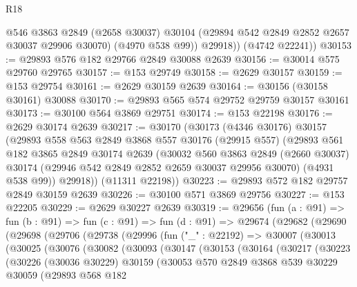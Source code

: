 \begin{lexlean}{R18}
\begin{coremodule}
            @546
            @3863
            @2849
            (@2658 @30037)
            @30104
            (@29894 @542 @2849 @2852 @2657 @30037 @29906 @30070)
            (@4970 @538 @99))
          @29918))
      (@4742 @22241))
@30153 := @29893 @576 @182 @29766 @2849 @30088 @2639
@30156 := @30014 @575 @29760 @29765
@30157 := @153 @29749
@30158 := @2629 @30157
@30159 := @153 @29754
@30161 := @2629 @30159 @2639
@30164 := @30156 (@30158 @30161) @30088
@30170 := @29893 @565 @574 @29752 @29759 @30157 @30161
@30173 := @30100 @564 @3869 @29751
@30174 := @153 @22198
@30176 := @2629 @30174 @2639
@30217 := @30170
    (@30173
      (@4346 @30176)
      @30157
      (@29893
        @558
        @563
        @2849
        @3868
        @557
        @30176
        (@29915 @557)
        (@29893
          @561
          @182
          @3865
          @2849
          @30174
          @2639
          (@30032
            @560
            @3863
            @2849
            (@2660 @30037)
            @30174
            (@29946 @542 @2849 @2852 @2659 @30037 @29956 @30070)
            (@4931 @538 @99))
          @29918))
      (@11311 @22198))
@30223 := @29893 @572 @182 @29757 @2849 @30159 @2639
@30226 := @30100 @571 @3869 @29756
@30227 := @153 @22205
@30229 := @2629 @30227 @2639
@30319 := @29656
    (fun (a : @91) =>
    fun (b : @91) =>
    fun (c : @91) =>
    fun (d : @91) =>
    @29674
      (@29682
        (@29690
          (@29698
            (@29706
              (@29738
                (@29996
                  (fun ("_" : @22192) =>
                  @30007
                    (@30013
                      (@30025
                        (@30076
                          (@30082
                            (@30093
                              (@30147
                                (@30153
                                  (@30164
                                    (@30217
                                      (@30223
                                        (@30226
                                          (@30036 @30229)
                                          @30159
                                          (@30053
                                            @570
                                            @2849
                                            @3868
                                            @539
                                            @30229
                                            @30059
                                            (@29893
                                              @568
                                              @182

\end{coremodule}
\end{lexlean}
